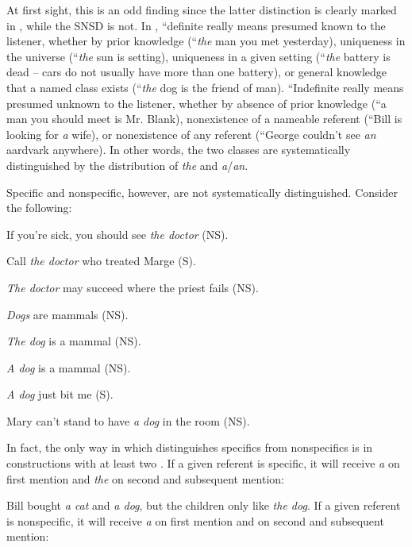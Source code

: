At first sight, this is an odd finding since the latter distinction is clearly marked in , while the SNSD is not. In , ``definite really means presumed known to the listener, whether by prior knowledge (``\textit{the} man you met yesterday), uniqueness in the universe (``\textit{the} sun is setting), uniqueness in a given setting (``\textit{the} battery is dead -- cars do not usually have more than one battery), or general knowledge that a named class exists (``\textit{the} dog is the friend of man). ``Indefinite really means presumed unknown to the listener, whether by absence of prior knowledge (``a man you should meet is Mr. Blank), nonexistence of a nameable referent (``Bill is looking for \textit{a} wife), or nonexistence of any referent (``George couldn't see \textit{an} aardvark anywhere). In other words, the two classes are systematically distinguished by the distribution of \textit{the} and \textit{a}/\textit{an}.

Specific and nonspecific, however, are not systematically distinguished. Consider the following:

\ea\label{ex:3:1}
 If you're sick, you should see \textit{the doctor} (NS).
\z

\ea\label{ex:3:2}
 Call \textit{the doctor} who treated Marge (S).
\z

\ea\label{ex:3:3}
 \textit{The doctor} may succeed where the priest fails (NS).
\z

\ea\label{ex:3:4}
 \textit{Dogs} are mammals (NS).
\z

\ea\label{ex:3:5}
 \textit{The dog} is a mammal (NS).
\z

\ea\label{ex:3:6}
 \textit{A dog} is a mammal (NS).
\z

\ea\label{ex:3:7}
\textit{A dog} just bit me (S).
\z

\ea\label{ex:3:8}
 Mary can't stand to have \textit{a dog} in the room (NS). 
\z

In fact, the only way in which  distinguishes specifics from nonspecifics is in constructions with at least two . If a given referent is specific, it will receive \textit{a} on first mention and \textit{the} on second and subsequent mention:

\ea\label{ex:3:9}
 Bill bought \textit{a cat} and \textit{a dog}, but the children only like \textit{the dog}.
\glt
\z
If a given referent is nonspecific, it will receive \textit{a} on first mention and on second and subsequent mention:

